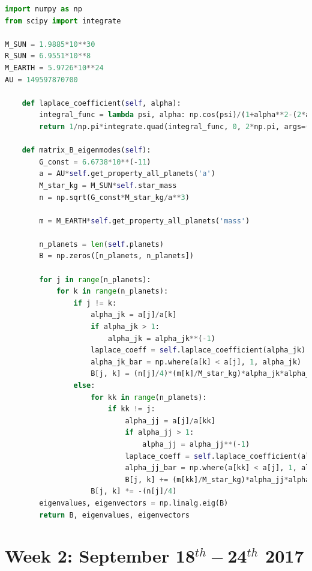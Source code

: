 \documentclass[11pt, oneside]{article}   	%
\begin{document}
\begin{lstlisting}[language=Python, caption={Calculate the frequency matrix, $\mathbf{B}$}]
import numpy as np
from scipy import integrate

M_SUN = 1.9885*10**30
R_SUN = 6.9551*10**8
M_EARTH = 5.9726*10**24
AU = 149597870700

    def laplace_coefficient(self, alpha):
        integral_func = lambda psi, alpha: np.cos(psi)/(1+alpha**2-(2*alpha*np.cos(psi)))**(3./2.)
        return 1/np.pi*integrate.quad(integral_func, 0, 2*np.pi, args=(alpha,))[0]
        
    def matrix_B_eigenmodes(self):
        G_const = 6.6738*10**(-11)
        a = AU*self.get_property_all_planets('a')
        M_star_kg = M_SUN*self.star_mass
        n = np.sqrt(G_const*M_star_kg/a**3)

        m = M_EARTH*self.get_property_all_planets('mass')

        n_planets = len(self.planets)
        B = np.zeros([n_planets, n_planets])

        for j in range(n_planets):
            for k in range(n_planets):
                if j != k:
                    alpha_jk = a[j]/a[k]
                    if alpha_jk > 1:
                        alpha_jk = alpha_jk**(-1)
                    laplace_coeff = self.laplace_coefficient(alpha_jk)
                    alpha_jk_bar = np.where(a[k] < a[j], 1, alpha_jk)
                    B[j, k] = (n[j]/4)*(m[k]/M_star_kg)*alpha_jk*alpha_jk_bar*laplace_coeff
                else:
                    for kk in range(n_planets):
                        if kk != j:
                            alpha_jj = a[j]/a[kk]
                            if alpha_jj > 1:
                                alpha_jj = alpha_jj**(-1)
                            laplace_coeff = self.laplace_coefficient(alpha_jj)
                            alpha_jj_bar = np.where(a[kk] < a[j], 1, alpha_jj)
                            B[j, k] += (m[kk]/M_star_kg)*alpha_jj*alpha_jj_bar*laplace_coeff
                    B[j, k] *= -(n[j]/4)
        eigenvalues, eigenvectors = np.linalg.eig(B)
        return B, eigenvalues, eigenvectors
\end{lstlisting}

\section{Week 2: September 18$^{th} - $24$^{th}$ 2017}

\newpage
\end{document}
